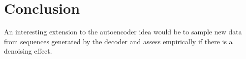 \chapter{Conclusion}
\label{chapter:conclusion}

An interesting extension to the autoencoder idea would be to sample new data
from sequences generated by the decoder and assess empirically if there is a
denoising effect.
